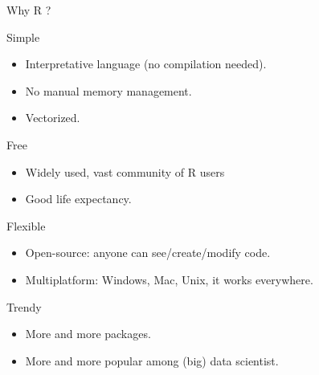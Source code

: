 \documentclass[10pt]{beamer}
\begin{document}
\begin{frame}{Why R ?}
  \begin{block}{Simple}
    \begin{itemize}
    \item Interpretative language (no compilation needed).
    \item No manual memory management.
    \item Vectorized.
    \end{itemize}    
  \end{block}
  \begin{block}{Free}
    \begin{itemize}
    \item Widely used, vast community of R users
    \item Good life expectancy.
    \end{itemize}
  \end{block}
  \begin{block}{Flexible}
    \begin{itemize}
    \item Open-source: anyone can see/create/modify code.
    \item Multiplatform: Windows, Mac, Unix, it works everywhere.
    \end{itemize}
  \end{block}
  \begin{block}{Trendy}
    \begin{itemize}
    \item More and more packages.
    \item More and more popular among (big) data scientist.
    \end{itemize}
  \end{block}
\end{frame}


\end{document}
